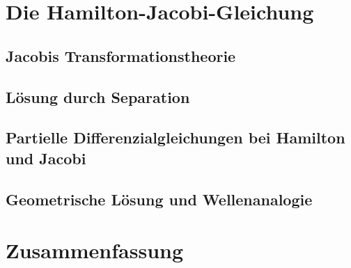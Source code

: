 \documentclass{beamer}
\begin{document}
    
\section{Die Hamilton-Jacobi-Gleichung}

    \subsection{Jacobis Transformationstheorie}
    
    \subsection{Lösung durch Separation}
    
    \subsection{Partielle Differenzialgleichungen bei Hamilton und Jacobi}

    \subsection{Geometrische Lösung und Wellenanalogie}

\section{Zusammenfassung}
\end{document}
